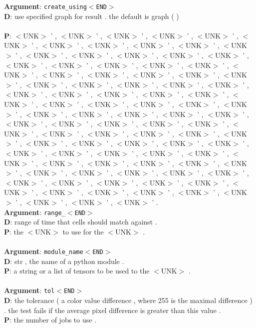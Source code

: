 \textbf{Argument}: \texttt{create\_using$<$END$>$}\\
\textbf{D}: use specified graph for result . the default is graph ( )\\
\\
\textbf{P}: $<$UNK$>$ ' , $<$UNK$>$ ' , $<$UNK$>$ ' , $<$UNK$>$ ' , $<$UNK$>$ ' , $<$UNK$>$ ' , $<$UNK$>$ ' , $
<$UNK$>$ ' , $<$UNK$>$ ' , $<$UNK$>$ ' , $<$UNK$>$ ' , $<$UNK$>$ ' , $<$UNK$>$ ' , $<$UNK$>$ ' , $<$UNK$>$ ' , $<$UNK$>$ ' , $<$UNK$>$ ' , $<$UNK$>$ ' , $<$UNK$>$ ' , $<$UNK$>$ ' , $<$UNK$>$ ' , $<$UNK$>$ ' , $<$UNK$>$ ' , $<$UNK$>$ ' , $<$UNK$>$ ' , $<$UNK$>$ ' , $<$UNK$>$ ' , $<$UNK$>$ ' , $<$UNK$>$ ' , $<$UNK$>$ ' , $<$UNK$>$ ' , $<$UNK$>$ ' , $<$UNK$>$ ' , $<$UNK$>$ ' , $<$UNK$>$ ' , $<$UNK$>$ ' , $<$UNK$>$ ' , $<$UNK$>$ ' , $<$UNK$>$ ' , $<$UNK$>$ ' , $<$UNK$>$ ' , $<$UNK$>$ ' , $<$UNK$>$ ' , $<$UNK$>$ ' , $<$UNK$>$ ' , $<$UNK$>$ ' , $<$UNK$>$ ' , $<$UNK$>$ ' , $<$UNK$>$ ' , $<$UNK$>$ ' , $<$UNK$>$ ' , $<$UNK$>$ ' , $<$UNK$>$ ' , $<$UNK$>$ ' , $<$UNK$>$ ' , $<$UNK$>$ ' , $<$UNK$>$ ' , $<$UNK$>$ ' , $<$UNK$>$ ' , $<$UNK$>$ ' , $<$UNK$>$ ' , $<$UNK$>$ ' , $<$UNK$>$ ' , $<$UNK$>$ ' , $<$UNK$>$ ' , $<$UNK$>$ ' , $<$UNK$>$ ' , $<$UNK$>$ ' , $<$UNK$>$ ' , $<$UNK$>$ ' , $<$UNK$>$ ' , $<$UNK$>$ ' , $<$UNK$>$ ' , $<$UNK$>$ ' , $<$UNK$>$ ' , $<$UNK$>$ ' , $<$UNK$>$ ' , $<$UNK$>$ ' , $<$UNK$>$ ' , $<$UNK$>$ ' , $<$UNK$>$ ' , $<$UNK$>$ ' , $<$UNK$>$ ' , $<$UNK$>$ ' , $<$UNK$>$ ' , $<$UNK$>$ ' , $<$UNK$>$ ' , $<$UNK$>$ ' , $<$UNK$>$ ' , $<$UNK$>$ ' , $<$UNK$>$ ' , $<$UNK$>$ ' , $<$UNK$>$ ' , $<$UNK$>$ ' .\\
\textbf{Argument}: \texttt{range\_$<$END$>$}\\
\textbf{D}: range of time that cells should match against .\\
\textbf{P}: the $<$UNK$>$ to use for the $<$UNK$>$ .\\
\\

\textbf{Argument}: \texttt{module\_name$<$END$>$}\\
\textbf{D}: str , the name of a python module .\\
\textbf{P}: a string or a list of tensors to be used to the $<$UNK$>$ .\\
\\

\textbf{Argument}: \texttt{tol$<$END$>$}\\
\textbf{D}: the tolerance ( a color value difference , where 255 is the maximal difference ) . the test fails if the average pixel difference is greater than this value .\\
\textbf{P}: the number of jobs to use .\\
\\

